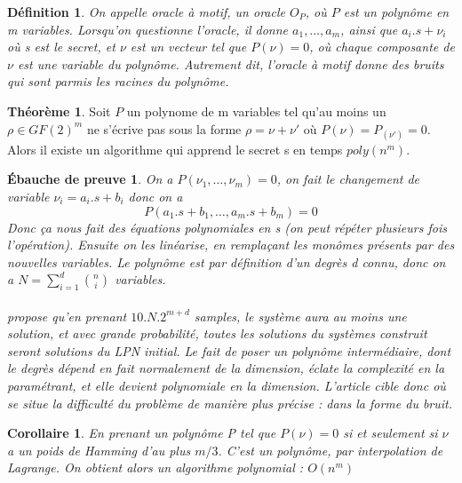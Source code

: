 \documentclass{article}		%
\newtheorem{defi}{Définition}
\theoremstyle{definition}
\newtheorem{theo}{Théorème}
\theoremstyle{plain}
\newtheorem{intui}{Ébauche de preuve}
\theoremstyle{plain}
\newtheorem{coro}{Corollaire}
\theoremstyle{plain}
\theoremstyle{plain}
\begin{document}
\begin{framed}
\begin{defi}
On appelle oracle à motif, un oracle $O_P$, où $P$ est un polynôme en m
variables. Lorsqu'on questionne l'oracle, il donne $a_1, \dots, a_m$,
ainsi que $a_i.s+\nu_i$ où s est le secret, et $\nu$ est un vecteur tel
que $P(\nu)=0$, où chaque composante de $\nu$ est une variable du
polynôme. Autrement dit, l'oracle à motif donne des bruits qui sont
parmis les racines du polynôme.
\end{defi}

\begin{theo}
Soit $P$ un polynome de m variables tel qu'au moins un $\rho\in GF(2)^m$
ne s'écrive pas sous la forme $\rho=\nu + \nu'$ où $P(\nu)=P_(\nu')=0$.
Alors il existe un algorithme qui apprend le secret s en temps
$poly(n^m)$.
\end{theo}

\begin{intui}
On a $P(\nu_1,\dots,\nu_m)=0$, on fait le changement de variable
$\nu_i=a_i.s+b_i$ donc on a 
$$P(a_1.s+b_1, \dots, a_m.s+b_m)=0$$
Donc ça nous fait des équations polynomiales en s (on peut répéter
plusieurs fois l'opération). Ensuite on les
linéarise, en remplaçant les monômes présents par des nouvelles
variables. Le polynôme est par définition d'un degrès d connu, donc on a
$N=\sum_{i=1}^d \binom{n}{i}$ variables.
\\\\
\cite{Arora} propose qu'en prenant $10.N.2^{m+d}$ samples, le système
aura au moins une solution, et avec grande probabilité, toutes les
solutions du systèmes construit seront solutions du LPN initial.
Le fait de poser un polynôme intermédiaire, dont le degrès dépend en fait
normalement
de la dimension, éclate la complexité en la paramétrant, et elle devient
polynomiale en la dimension. L'article cible donc où se situe la
difficulté du problème de manière plus précise : dans la forme du bruit. 
\end{intui}
 
\begin{coro}
En prenant un polynôme P tel que $P(\nu)=0$ si et seulement si $\nu$ a un
poids de Hamming d'au plus $m/3$. C'est un polynôme, par interpolation de
Lagrange. On obtient alors un algorithme
polynomial : $O(n^m)$
\end{coro}
\end{framed}
\end{document}
